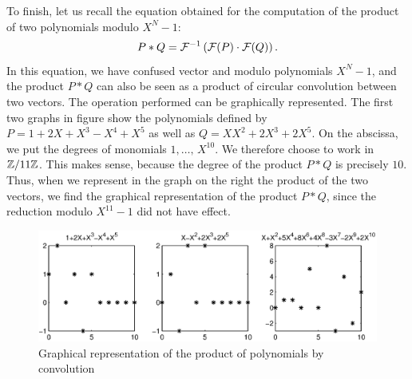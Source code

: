  
To finish, let us recall the equation obtained for the computation of the product of two polynomials modulo $ X^N-1 $:
\begin{equation}
\label{eq-prod-cyclic-polynomial}
P * Q = \mathcal{F}^{-1} \left(\mathcal{F}(P) \cdot \mathcal{F}(Q) \right).
\end{equation}
 In this equation, we have confused vector and modulo polynomials $ X^N-1 $, and the product $ P * Q $ can also be seen as a product of circular convolution between two vectors. The operation performed can be graphically represented. The first two graphs in figure  show the polynomials defined by $ P = 1 + 2X + X^3-X^4 + X^5 $ as well as $ Q = XX^2 + 2X^3 + 2X^5$. On the abscissa, we put the degrees of monomials $ 1, \ldots, \, X^{10} $. We therefore choose to work in $ \mathbb{Z}/11 \mathbb{Z} $. This makes sense, because the degree of the product $ P * Q $ is precisely $ 10 $. Thus, when we represent in the graph on the right the product of the two vectors, we find the graphical representation of the product $ P * Q $, since the reduction modulo $ X^{11} -1 $ did not have effect. \begin{figure}[ht]
    \begin{center}
    \includegraphics[scale=0.7]{images/convolution-polynome.eps}
    \end{center}
    \caption{Graphical representation of the product of polynomials by convolution}
              \label{fig-convolution-polynomial}
\end{figure}
 
